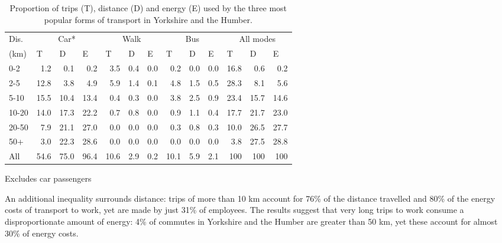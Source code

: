 \begin{table}[htbp]
\caption[Proportion of trips (T), distance (D) and energy (E)
by mode]{Proportion of trips (T), distance (D) and energy (E)
used by the three most
popular forms of transport in Yorkshire and the Humber.}
\begin{center}
\begin{tabular}{lrrr|rrr|rrr|rrr}
\toprule
Dis. & \multicolumn{ 3}{c}{Car*} & \multicolumn{ 3}{c}{Walk} & \multicolumn{
3}{c}{Bus} & \multicolumn{ 3}{c}{All modes} \\
(km) & \multicolumn{1}{l}{T} & \multicolumn{1}{l}{D} & \multicolumn{1}{l}{E} &
\multicolumn{1}{l}{T} & \multicolumn{1}{l}{D} & \multicolumn{1}{l}{E} &
\multicolumn{1}{l}{T} &
\multicolumn{1}{l}{D} & \multicolumn{1}{l}{E} & \multicolumn{1}{l}{T} &
\multicolumn{1}{l}{D} & \multicolumn{1}{l}{E} \\ \midrule
0-2 & 1.2 & 0.1 & 0.2 & 3.5 & 0.4 & 0.0 & 0.2 & 0.0 & 0.0 & 16.8 & 0.6 & 0.2 \\
2-5 & 12.8 & 3.8 & 4.9 & 5.9 & 1.4 & 0.1 & 4.8 & 1.5 & 0.5 & 28.3 & 8.1 & 5.6 \\
5-10 & 15.5 & 10.4 & 13.4 & 0.4 & 0.3 & 0.0 & 3.8 & 2.5 & 0.9 & 23.4 & 15.7 &
14.6 \\
10-20 & 14.0 & 17.3 & 22.2 & 0.7 & 0.8 & 0.0 & 0.9 & 1.1 & 0.4 & 17.7 & 21.7 &
23.0 \\
20-50 & 7.9 & 21.1 & 27.0 & 0.0 & 0.0 & 0.0 & 0.3 & 0.8 & 0.3 & 10.0 & 26.5 &
27.7 \\
50+ & 3.0 & 22.3 & 28.6 & 0.0 & 0.0 & 0.0 & 0.0 & 0.0 & 0.0 & 3.8 & 27.5 & 28.8
\\
All & 54.6 & 75.0 & 96.4 & 10.6 & 2.9 & 0.2 & 10.1 & 5.9 & 2.1 & 100 & 100 & 100
\\ \bottomrule
\end{tabular}\end{center}
\label{t:props}
{\footnotesize *Excludes car passengers}
\end{table}

An additional inequality surrounds distance: trips of more than 10 km account
for
76\% of the distance travelled and 80\% of the energy costs of transport to
work,
yet are made by just 31\% of employees. The results suggest that very long trips
to work consume a disproportionate amount of energy: 4\% of commutes in
Yorkshire and
the Humber are greater than 50 km, yet these account for almost 30\% of energy
costs.


